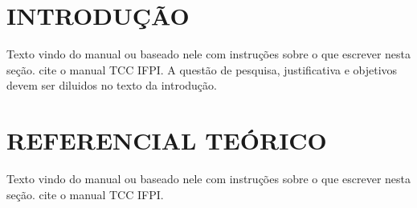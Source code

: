 





\frenchspacing




\section{INTRODUÇÃO}
\label{sec:introducao}

Texto vindo do manual ou baseado nele com instruções sobre o que escrever nesta seção. cite o manual TCC IFPI.
A questão de pesquisa, justificativa e objetivos devem ser diluidos no texto da introdução.

\section{REFERENCIAL TEÓRICO}
\label{sec:referencial}

Texto vindo do manual ou baseado nele com instruções sobre o que escrever nesta seção. cite o manual TCC IFPI.

